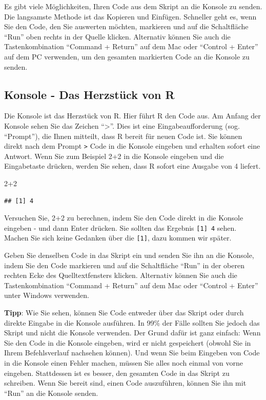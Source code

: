 \documentclass[
]{book}
\newenvironment{Shaded}{\begin{snugshade}}{\end{snugshade}}
\newcommand{\DecValTok}[1]{\textcolor[rgb]{0.00,0.00,0.81}{#1}}
\newcommand{\SpecialCharTok}[1]{\textcolor[rgb]{0.00,0.00,0.00}{#1}}
\begin{document}
Es gibt viele Möglichkeiten, Ihren Code aus dem Skript an die Konsole zu senden. Die langsamste Methode ist das Kopieren und Einfügen. Schneller geht es, wenn Sie den Code, den Sie auswerten möchten, markieren und auf die Schaltfläche ``Run'' oben rechts in der Quelle klicken. Alternativ können Sie auch die Tastenkombination ``Command + Return'' auf dem Mac oder ``Control + Enter'' auf dem PC verwenden, um den gesamten markierten Code an die Konsole zu senden.

\hypertarget{konsole---das-herzstuxfcck-von-r}{%
\subsection{Konsole - Das Herzstück von R}\label{konsole---das-herzstuxfcck-von-r}}

Die Konsole ist das Herzstück von R. Hier führt R den Code aus. Am Anfang der Konsole sehen Sie das Zeichen ``\textgreater{}''. Dies ist eine Eingabeaufforderung (sog. ``Prompt''), die Ihnen mitteilt, dass R bereit für neuen Code ist. Sie können direkt nach dem Prompt \texttt{\textgreater{}} Code in die Konsole eingeben und erhalten sofort eine Antwort. Wenn Sie zum Beispiel 2+2 in die Konsole eingeben und die Eingabetaste drücken, werden Sie sehen, dass R sofort eine Ausgabe von 4 liefert.

\begin{Shaded}
\begin{Highlighting}[]
\DecValTok{2}\SpecialCharTok{+}\DecValTok{2}
\end{Highlighting}
\end{Shaded}

\begin{verbatim}
## [1] 4
\end{verbatim}

Versuchen Sie, 2+2 zu berechnen, indem Sie den Code direkt in die Konsole eingeben - und dann Enter drücken.
Sie sollten das Ergebnis \texttt{{[}1{]}\ 4} sehen. Machen Sie sich keine Gedanken über die \texttt{{[}1{]}}, dazu kommen wir später.

Geben Sie denselben Code in das Skript ein und senden Sie ihn an die Konsole, indem Sie den Code markieren und auf die Schaltfläche ``Run'' in der oberen rechten Ecke des Quelltextfensters klicken. Alternativ können Sie auch die Tastenkombination ``Command + Return'' auf dem Mac oder ``Control + Enter'' unter Windows verwenden.

\textbf{Tipp}: Wie Sie sehen, können Sie Code entweder über das Skript oder durch direkte Eingabe in die Konsole ausführen. In 99\% der Fälle sollten Sie jedoch das Skript und nicht die Konsole verwenden. Der Grund dafür ist ganz einfach: Wenn Sie den Code in die Konsole eingeben, wird er nicht gespeichert (obwohl Sie in Ihrem Befehlsverlauf nachsehen können). Und wenn Sie beim Eingeben von Code in die Konsole einen Fehler machen, müssen Sie alles noch einmal von vorne eingeben. Stattdessen ist es besser, den gesamten Code in das Skript zu schreiben. Wenn Sie bereit sind, einen Code auszuführen, können Sie ihn mit ``Run'' an die Konsole senden.
\end{document}
